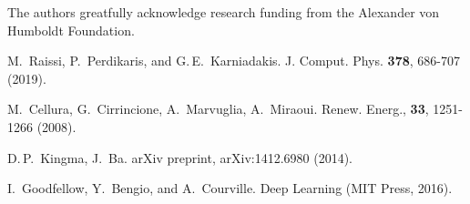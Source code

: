 \documentclass[pamm,a4paper,fleqn]{w-art}
\begin{document}
\begin{acknowledgement}
  The authors greatfully acknowledge research funding from the Alexander von
  Humboldt Foundation.
\end{acknowledgement}

\vspace{\baselineskip}

\begin{thebibliography}{1}

  M.~Raissi, P.~Perdikaris, and G.\,E.~Karniadakis.
  J. Comput. Phys. \textbf{378}, 686-707 (2019).

  M.~Cellura, G.~Cirrincione, A.~Marvuglia, A.~Miraoui.
  Renew. Energ., \textbf{33}, 1251-1266 (2008).

  D.\,P.~Kingma, J.~Ba.
  arXiv preprint, arXiv:1412.6980 (2014).

  I.~Goodfellow, Y.~Bengio, and A.~Courville.
  Deep Learning (MIT Press, 2016).

\end{thebibliography}
\end{document}
